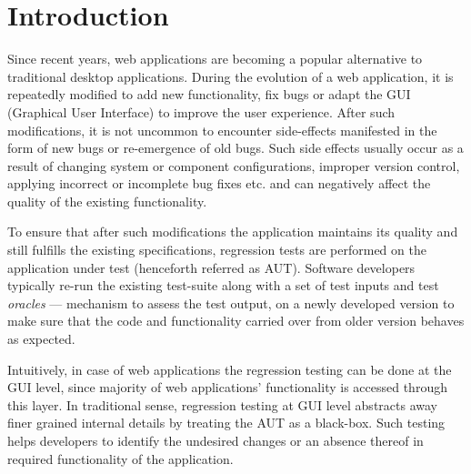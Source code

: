 \chapter{Introduction} %


\label{Chapter1} %

Since recent years, web applications are becoming a popular alternative to traditional desktop applications.
During the evolution of a web application, it is repeatedly modified to add new functionality, fix bugs or adapt the GUI (Graphical User Interface) to improve the user experience. After such modifications, it is not uncommon to encounter side-effects manifested in the form of new bugs or re-emergence of old bugs. Such side effects usually occur as a result of changing system or component configurations, improper version control, applying incorrect or incomplete bug fixes etc. and can negatively affect the quality of the existing functionality. 

To ensure that after such modifications the application maintains its quality and still fulfills the existing specifications, regression tests are performed on the application under test (henceforth referred as AUT). Software developers typically re-run the existing test-suite along with a set of test inputs and test \textit{oracles} — mechanism to assess the test output, on a newly developed version to make sure that the code and functionality carried over from older version behaves as expected.


Intuitively, in case of web applications the regression testing can be done at the GUI level, since majority of web applications’ functionality is accessed through this layer. In traditional sense, regression testing at GUI level abstracts away finer grained internal details by treating the AUT as a black-box. Such testing helps developers to identify the undesired  changes or an absence thereof in required functionality of the application.

